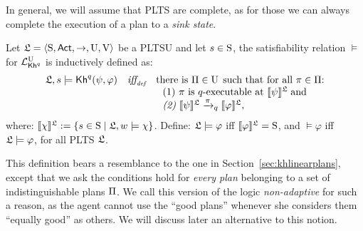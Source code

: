 In general, we will assume that PLTS are complete, as for those we can always complete the execution of a plan to a \emph{sink state}.


\begin{definition} \label{def:semantics-non-adap}
    Let $\model = \tup{\S,\Act,\ra,\Unc,\V}$ be a PLTSU and let $s\in\S$, the satisfiability relation $\models$ for $\PKhunc$ is inductively defined as:
    \[
    \begin{array}{l@{\ \ \ }c@{\ \ \  }l}
    \model, s \models \kh^q(\psi,\varphi) & \iffdef & \text{there is } \plans \in \Unc \;\text{such that for all } \plan\in\plans{:} \\
    & & \ \ \text{\rm (1)} \ \plan \text{ is $q$-executable at }  \truthset{\model}{\psi}\; \text{and} \\
    & & \ \ \text{\em (2)} \ \truthset{\model}{\psi} \reach{\plan}_q \truthset{\model}{\varphi}, 
    \end{array}
    \]     
    \noindent where: $\truthset{\model}{\chi} := \csetsc{s\in\S}{\model,w\models\chi}$. Define: $\model\models\varphi$ iff  $\truthset{\model}{\varphi}=\S$, and $\models\varphi$ iff $\model\models\varphi$, for all PLTS $\model$.
\end{definition}

This definition bears a resemblance to the one in Section~\ref{sec:khlinearplans}, except that we ask the conditions hold for \emph{every plan} belonging to a set of indistinguishable plans $\plans$. We call this version of the logic \emph{non-adaptive} for such a reason, as the agent cannot use the ``good plans'' whenever she considers them ``equally good'' as others.  We will discuss later an alternative to this notion.

